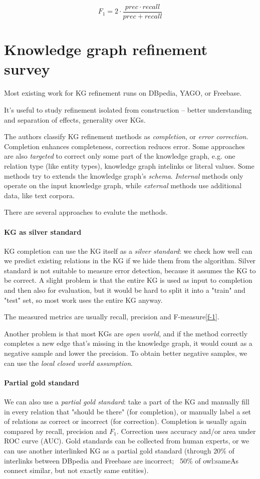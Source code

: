 $$F_1 = 2\cdot\frac{prec \cdot recall}{prec + recall}$$

\section{Knowledge graph refinement survey\cite{kg-refinement-survey}}

Most existing work for KG refinement runs on DBpedia, YAGO, or Freebase.

It's useful to study refinement isolated from construction -- better
understanding and separation of effects, generality over KGs.

The authors classify KG refinement methods as \textit{completion}, or
\textit{error correction}. Completion enhances completeness, correction
reduces error.
Some approaches are also \textit{targeted} to correct only some part of the
knowledge graph, e.g. one relation type (like entity types), knowledge graph
intelinks or literal values.
Some methods try to extends the knowledge graph's \textit{schema}.
\textit{Internal} methods only operate on the input knowledge graph, while
\textit{external} methods use additional data, like text corpora.

There are several approaches to evalute the methods.
\paragraph{KG as silver standard}
KG completion can use the KG itself as a \textit{silver standard}: we check how
well can we predict existing relations in the KG if we hide them from the
algorithm. Silver standard is not suitable to measure error detection, because
it assumes the KG to be correct.
A slight problem is that the entire KG is used as input to completion and then
also for evaluation, but it would be hard to split it into a "train" and "test"
set, so most work uses the entire KG anyway.

The measured metrics are usually recall, precision and F-measure\ref{f-1}.

Another problem is that most KGs are \textit{open world}, and if the method
correctly completes a new edge that's missing in the knowledge graph, it would
count as a negative sample and lower the precision. To obtain better negative
samples, we can use the \textit{local closed world assumption}.

\paragraph{Partial gold standard}
We can also use a \textit{partial gold standard}: take a part of the KG and
manually fill in every relation that "should be there" (for completion), or
manually label a set of relations as correct or incorrect (for correction).
Completion is usually again compared by recall, precision and $F_1$.
Correction uses accuracy and/or area under ROC curve (AUC).
Gold standards can be collected from human experts, or we can use another
interlinked KG as a partial gold standard (through 20\% of interlinks between
DBpedia and Freebase are incorrect; ~50\% of owl:sameAs connect similar, but not
exactly same entities).

